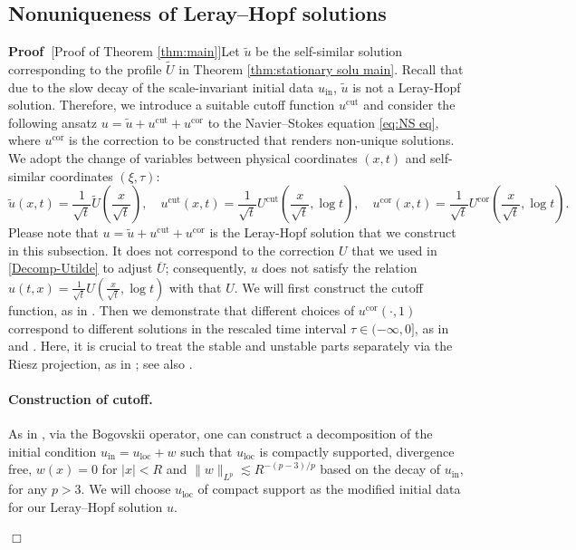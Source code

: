 \documentclass[11pt,a4paper]{article}
\numberwithin{equation}{section}
\newcommand{\tmop}[1]{\ensuremath{\operatorname{#1}}}
\newenvironment{proof}{\noindent\textbf{Proof\ }}{\hspace*{\fill}$\Box$\medskip}
\begin{document}
\subsection{Nonuniqueness of Leray--Hopf solutions}
\label{Sec2:nonuniqueness}
\begin{proof}[Proof of Theorem \ref{thm:main}]Let $\widetilde{u}$ be the self-similar solution corresponding to the profile $\widetilde{U}$ in Theorem \ref{thm:stationary solu main}. Recall that due to the slow decay of the scale-invariant initial data $u_{\text{in}}$, $\widetilde{u}$ is not a Leray-Hopf solution. Therefore, we introduce a suitable cutoff function $u^{\text{cut}}$ and
consider the following ansatz $u=\widetilde{u}+u^{\text{cut}}+u^{\text{cor}}$ to the Navier--Stokes equation \eqref{eq:NS eq}, where  $u^{\text{cor}}$ is the correction to be constructed that renders non-unique solutions. We adopt the change of variables between physical coordinates $(x,t)$ and self-similar coordinates $(\xi,\tau)$:  \begin{equation}
    \widetilde{u}(x,t)=\frac{1}{\sqrt{t}}\widetilde{U}(\frac{x}{\sqrt{t}}),\quad u^{\text{cut}}(x,t)=\frac{1}{\sqrt{t}}U^{\text{cut}}(\frac{x}{\sqrt{t}},\log t),\quad u^{\text{cor}}(x,t)=\frac{1}{\sqrt{t}}U^{\text{cor}}(\frac{x}{\sqrt{t}},\log t).\label{cov}
\end{equation}  Please note that $u=\widetilde{u}+u^{\text{cut}}+u^{\text{cor}}$ is the Leray-Hopf solution that we construct in this subsection. It does not correspond to the correction $U$ that we used in \eqref{Decomp-Utilde} to adjust $\overline{U}$; consequently, $u$ does not satisfy the relation $u(t,x) = \frac{1}{\sqrt{t}}U(\frac{x}{\sqrt{t}},\log t)$ with that $U$. We will first construct the cutoff function, as in \cite{jia2015incompressible}. Then we demonstrate that different choices of $u^{\text{cor}}(\cdot,1)$ correspond to different solutions in the rescaled time interval $\tau\in (-\infty,0]$, as in \cite{albritton2022non} and \cite{jia2015incompressible}. Here, it is crucial to treat the stable and unstable parts separately via the Riesz projection, as in \cite{jia2015incompressible}; see also \cite{chen2024vorticity, chen2025vorticity}.

\paragraph{Construction of cutoff.} As in \cite{jia2015incompressible}, via the Bogovskii operator, one can construct a decomposition of the initial condition $u_{\tmop{in}}=u_{\tmop{loc}}+w$ such that $u_{\tmop{loc}}$ is compactly supported, divergence free, $w(x)=0$ for $|x|<R$ and $\|w\|_{L^p}\lesssim R^{-(p-3)/p}$ based on the decay of $u_{\tmop{in}}$, for any $p>3$. We will choose $u_{\tmop{loc}}$ of compact support as the modified initial data for our Leray--Hopf solution $u$.


\end{proof}
\end{document}
